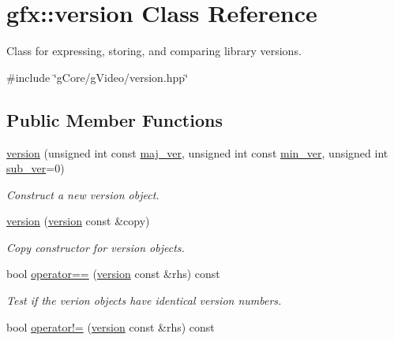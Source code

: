 \hypertarget{classgfx_1_1version}{\section{gfx\-:\-:version Class Reference}
\label{classgfx_1_1version}
}


Class for expressing, storing, and comparing library versions.  




{\ttfamily \#include \char`\"{}g\-Core/g\-Video/version.\-hpp\char`\"{}}

\subsection*{Public Member Functions}
\begin{DoxyCompactItemize}
\item 
\hyperlink{classgfx_1_1version_a6d4d9a8baf6447a0327e79a9db8c6e7b}{version} (unsigned int const \hyperlink{classgfx_1_1version_a90b65c4eb3cd1307e8ec829e689ca1ce}{maj\-\_\-ver}, unsigned int const \hyperlink{classgfx_1_1version_ab29bdb998f400f1389a1862ab03791bb}{min\-\_\-ver}, unsigned int \hyperlink{classgfx_1_1version_a3324fecb8963b79b3d941e8cfa485761}{sub\-\_\-ver}=0)
\begin{DoxyCompactList}\small\item\em Construct a new version object. \end{DoxyCompactList}\item 
\hypertarget{classgfx_1_1version_ac1d3d43f6fdb3fe462f5f3d21d2ac2db}{\hyperlink{classgfx_1_1version_ac1d3d43f6fdb3fe462f5f3d21d2ac2db}{version} (\hyperlink{classgfx_1_1version}{version} const \&copy)}\label{classgfx_1_1version_ac1d3d43f6fdb3fe462f5f3d21d2ac2db}

\begin{DoxyCompactList}\small\item\em Copy constructor for version objects. \end{DoxyCompactList}\item 
\hypertarget{classgfx_1_1version_a799b32ab07391f77bd6563bd7272a6a7}{bool \hyperlink{classgfx_1_1version_a799b32ab07391f77bd6563bd7272a6a7}{operator==} (\hyperlink{classgfx_1_1version}{version} const \&rhs) const }\label{classgfx_1_1version_a799b32ab07391f77bd6563bd7272a6a7}

\begin{DoxyCompactList}\small\item\em Test if the verion objects have identical version numbers. \end{DoxyCompactList}\item 
\hypertarget{classgfx_1_1version_ae5fd4ee0af61a2068d8179e763a88108}{bool \hyperlink{classgfx_1_1version_ae5fd4ee0af61a2068d8179e763a88108}{operator!=} (\hyperlink{classgfx_1_1version}{version} const \&rhs) const }\label{classgfx_1_1version_ae5fd4ee0af61a2068d8179e763a88108}


\end{DoxyCompactItemize}
